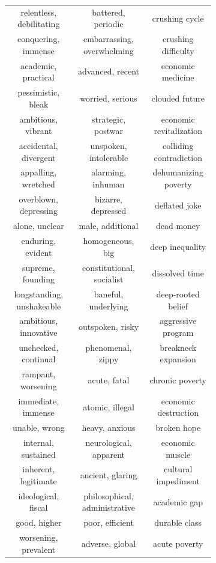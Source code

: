 \documentclass[9pt,twocolumn,twoside,lineno]{pnas-new}
\begin{document}
\begin{figure}
\begin{subfigure}{0.3\textwidth}
\begin{center}
\begin{tabular}{ c | c | c  }
			\tiny relentless, debilitating & \tiny battered, periodic & \tiny crushing cycle\\
			\tiny conquering, immense & \tiny embarrassing, overwhelming & \tiny crushing difficulty\\
			\tiny academic, practical & \tiny advanced, recent & \tiny economic medicine\\
			\tiny pessimistic, bleak & \tiny worried, serious & \tiny clouded future\\
			\tiny ambitious, vibrant & \tiny strategic, postwar & \tiny economic revitalization\\
			\tiny accidental, divergent & \tiny unspoken, intolerable & \tiny colliding contradiction\\
			\tiny appalling, wretched & \tiny alarming, inhuman & \tiny dehumanizing poverty\\
			\tiny overblown, depressing & \tiny bizarre, depressed & \tiny deflated joke\\
			\tiny alone, unclear & \tiny male, additional & \tiny dead money\\
			\tiny enduring, evident & \tiny homogeneous, big & \tiny deep inequality\\
			\tiny supreme, founding & \tiny constitutional, socialist & \tiny dissolved time\\
			\tiny longstanding, unshakeable & \tiny baneful, underlying & \tiny deep-rooted belief\\
			\tiny ambitious, innovative & \tiny outspoken, risky & \tiny aggressive program\\
			\tiny unchecked, continual & \tiny phenomenal, zippy & \tiny breakneck expansion\\
			\tiny rampant, worsening & \tiny acute, fatal & \tiny chronic poverty\\
			\tiny immediate, immense & \tiny atomic, illegal & \tiny economic destruction\\
			\tiny unable, wrong & \tiny heavy, anxious & \tiny broken hope\\
			\tiny internal, sustained & \tiny neurological, apparent & \tiny economic muscle\\
			\tiny inherent, legitimate & \tiny ancient, glaring & \tiny cultural impediment\\
			\tiny ideological, fiscal & \tiny philosophical, administrative & \tiny academic gap\\
			\tiny good, higher & \tiny poor, efficient & \tiny durable class\\
			\tiny worsening, prevalent & \tiny adverse, global & \tiny acute poverty\\

\end{tabular}
\end{center}
\end{subfigure}
\end{figure}
\end{document}
